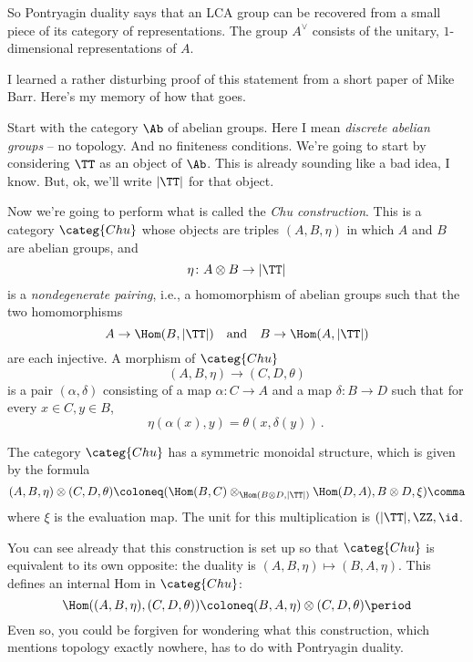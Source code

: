 \documentclass[leqno]{article}
\begin{document}
So Pontryagin duality says that an LCA group can be recovered from
a small piece of its category of representations.
The group \(A^{\vee}\) consists of
the unitary, \(1\)-dimensional representations of \(A\).

I learned a rather disturbing proof of this statement
from a short paper of Mike Barr.
Here's my memory of how that goes.

Start with the category \(\Ab\) of abelian groups.
Here I mean \emph{discrete abelian groups} -- no topology.
And no finiteness conditions.
We're going to start by considering \(\TT\) as an object of \(\Ab\).
This is already sounding like a bad idea, I know.
But, ok, we'll write \(|\TT|\) for that object.

Now we're going to perform what is called the \emph{Chu construction}.
This is a category \(\categ{Chu}\) whose objects are
triples \((A,B,\eta)\) in which \(A\) and \(B\) are abelian groups, and
\begin{equation*}
    \eta \colon A \otimes B \to |\TT|
\end{equation*}
is a \emph{nondegenerate pairing}, i.e.,
a homomorphism of abelian groups such that the two homomorphisms
\begin{equation*}
    A \to \Hom(B, |\TT|) \quad \text{and} \quad B \to \Hom(A, |\TT|)
\end{equation*}
are each injective.
A morphism of \(\categ{Chu}\)
\begin{equation*}
    (A, B, \eta) \to (C, D, \theta)
\end{equation*}
is a pair \((\alpha,\delta)\)
consisting of a map \(\alpha \colon C \to A\)
and a map \(\delta \colon B \to D\) such that
for every \(x\in C, y \in B\),
\begin{equation*}
    \eta(\alpha(x),y) = \theta(x,\delta(y)) \period
\end{equation*}

The category \(\categ{Chu}\) has a symmetric monoidal structure,
which is given by the formula
\begin{equation*}
    (A, B, \eta) \otimes (C, D, \theta) \coloneq (\Hom(B,C) \otimes_{\Hom(B \otimes D, |\TT|)} \Hom(D, A), B \otimes D, \xi) \comma
\end{equation*}
where \(\xi\) is the evaluation map.
The unit for this multiplication is \((|\TT|,\ZZ,\id\).

You can see already that this construction is set up so that
\(\categ{Chu}\) is equivalent to its own opposite:
the duality is \((A,B,\eta) \mapsto (B,A,\eta)\).
This defines an internal Hom in \(\categ{Chu}\):
\begin{equation*}
    \Hom((A,B,\eta),(C,D,\theta)) \coloneq (B,A,\eta) \otimes (C,D,\theta) \period
\end{equation*}
Even so, you could be forgiven for wondering what this construction,
which mentions topology exactly nowhere, has to do with Pontryagin duality.
\end{document}
